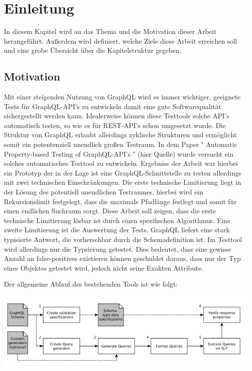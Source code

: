 \chapter{Einleitung}

In diesem Kapitel wird an das Thema und die Motivation dieser Arbeit herangeführt.
Außerdem wird definiert, welche Ziele diese Arbeit erreichen soll und eine grobe Übersicht über die
Kapitelstruktur gegeben.

\section{Motivation}

Mit einer steigenden Nutzung von GraphQL wird es immer wichtiger, geeignete Tests für GraphQL-API's zu entwickeln damit eine
gute Softwarequalität sichergestellt werden kann.
Idealerweise können diese Testtools solche API's automatisch testen,
so wie es für REST-API's schon umgesetzt wurde.
Die Struktur von GraphQL erlaubt allerdings zyklische Strukturen
und ermöglicht somit ein potentenziell unendlich großen Testraum.
In dem Paper " Automatic Property-based Testing of GraphQL-API's " (hier Quelle) wurde versucht ein solches
automatisches Testtool zu entwickeln. Ergebniss der Arbeit war hierbei ein Prototyp der in der Lage ist
eine GraphQL-Schnittstelle zu testen allerdings mit zwei technischen Einschränkungen.
Die erste technische Limitierung liegt in der Lösung des potentiell unendlichen Testraumes, hierbei
wird ein Rekursionslimit festgelegt, dass die maximale Pfadlänge festlegt und somit für einen endlichen Suchraum sorgt.
Diese Arbeit soll zeigen, dass die erste technische Limitierung lösbar ist durch einen spezifischen Algorithmus.
Eine zweite Limitierung ist die Auswertung der Tests. GraphQL liefert eine stark typisierte Antwort, die vorhersehbar
durch die Schemadefinition ist. Im Testtool wird allerdings nur die Typsierung getestet. Dies bedeutet, dass eine gewisse
Anzahl an false-positives existieren können geschuldet daraus, dass nur der Typ eines Objektes getestet wird, jedoch nicht
seine Exakten Attribute.

Der allgemeine Ablauf des bestehenden Tools ist wie folgt:
\begin{center}
    \includegraphics[width=\textwidth,height=\textheight,keepaspectratio]{content/einleitung/toolchain}
\end{center}

